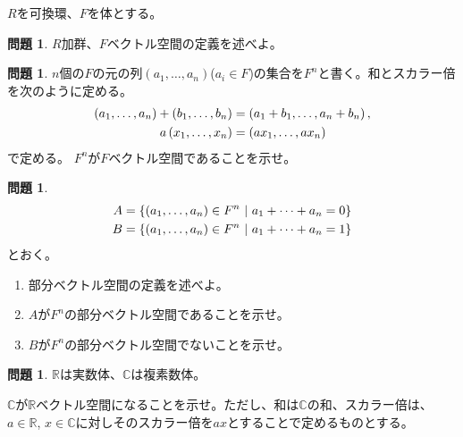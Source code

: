 \documentclass[uplatex]{jsarticle}
\theoremstyle{definition}
\numberwithin{equation}{section}
\newtheorem{prob}[section]{問題}
\newcommand{\midbar}{\ \middle| \ }
\newcommand{\R}{\mathbb{R}}
\newcommand{\C}{\mathbb{C}}
\begin{document}
$R$を可換環、$F$を体とする。
\begin{prob}
  $R$加群、$F$ベクトル空間の定義を述べよ。
\end{prob}

\begin{prob}
  $n$個の$F$の元の列$\left( a_1,\dots, a_n \right)$($a_i\in F$)の集合を$F^n$と書く。和とスカラー倍を次のように定める。
  \begin{align}
\left( a_1,\dots, a_n \right) + \left( b_1,\dots, b_n \right) &= \left(a_1 + b_1,\dots, a_n + b_n \right), \notag \\
  a\left( x_1,\dots, x_n \right) &= \left(ax_1,\dots, ax_n \right) \notag
\end{align}
で定める。
  $F^n$が$F$ベクトル空間であることを示せ。
\end{prob}

\begin{prob}
  \begin{align}
  A &= \left\{ (a_1,\dots, a_n) \in F^n \midbar a_1+\dots+a_n = 0 \right\} \notag \\
  B &= \left\{ (a_1,\dots, a_n) \in F^n \midbar a_1+\dots+a_n = 1 \right\} \notag
  \end{align}
  とおく。
  \begin{enumerate}
    \item 部分ベクトル空間の定義を述べよ。
    \item $A$が$F^n$の部分ベクトル空間であることを示せ。
    \item $B$が$F^n$の部分ベクトル空間でないことを示せ。
  \end{enumerate}
\end{prob}

\begin{prob}
  $\R$は実数体、$\C$は複素数体。

  $\C$が$\R$ベクトル空間になることを示せ。ただし、和は$\C$の和、スカラー倍は、$a\in\R$, $x\in \C$に対しそのスカラー倍を$ax$とすることで定めるものとする。
\end{prob}
\end{document}
